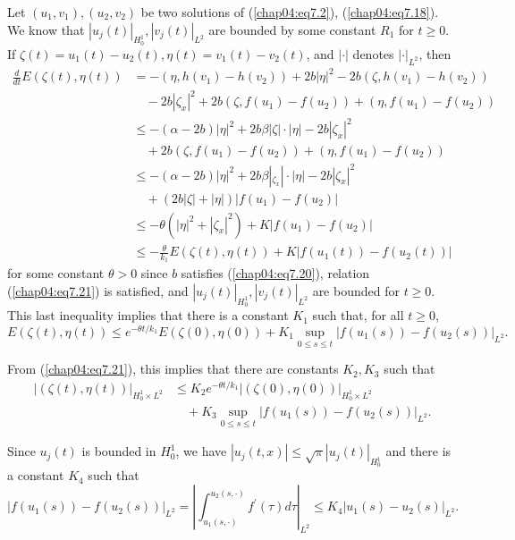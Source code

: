 \documentclass{surv-l}
\theoremstyle{plain}
\theoremstyle{definition}
\numberwithin{equation}{section}
\numberwithin{figure}{chapter}
\begin{document}
Let $(u_{1}, v_{1}), (u_{2}, v_{2})$ be two solutions of (\ref{chap04:eq7.2}), (\ref{chap04:eq7.18}). We know that $|u_{j}(t)|_{H_{0}^{1}}, |v_{j}(t)|_{L^{2}}$ are bounded by some constant $R_{1}$ for $t\geq 0$. If $\zeta(t)=u_{1}(t)-u_{2}(t), \eta(t)=v_{1}(t)-v_{2}(t)$, and $|\cdot|$ denotes $|\cdot|_{L^{2}}$, then
\begin{align*}
\frac{d}{dt}E(\zeta(t), \eta(t))&=-(\eta, h(v_{1})-h(v_{2}))+2b|\eta|^{2}-2b(\zeta, h(v_{1})-h(v_{2}))\\
&\quad-2b|\zeta_{x}|^{2}+2b(\zeta, f(u_{1})-f(u_{2}))+(\eta, f(u_{1})-f(u_{2}))\\
&\leq-(\alpha-2b)|\eta|^{2}+2b\beta|\zeta|\cdot|\eta|-2b|\zeta_{x}|^{2}\\
&\quad+2b(\zeta, f(u_{1})-f(u_{2}))+(\eta, f(u_{1})-f(u_{2}))\\
&\leq-(\alpha-2b)|\eta|^{2}+2b\beta|_{\zeta_{x}}|\cdot|\eta|-2b|\zeta_{x}|^{2}\\
&\quad+(2b|\zeta|+|\eta|)|f(u_{1})-f(u_{2})|\\
&\leq-\theta(|\eta|^{2}+|\zeta_{x}|^{2})+K|f(u_{1})-f(u_{2})|\\
&\leq-\frac{\theta}{k_{1}}E(\zeta(t), \eta(t))+K|f(u_{1}(t))-f(u_{2}(t))|
\end{align*}
for some constant $\theta>0$ since $b$ satisfies (\ref{chap04:eq7.20}), relation (\ref{chap04:eq7.21}) is satisfied, and $|u_{j}(t)|_{H_{0}^{1}}, |v_{j}(t)|_{L^{2}}$ are bounded for $t\geq 0$. This last inequality implies that there is a constant $K_{1}$ such that, for all $t\geq 0$,
\begin{equation}\label{chap04:eq7.22}
E(\zeta(t), \eta(t))\leq e^{-\theta t/k_{1}}E(\zeta(0), \eta(0))+K_{1}\sup_{0\leq s\leq t}|f(u_{1}(s))-f(u_{2}(s))|_{L^{2}}.
\end{equation}

From (\ref{chap04:eq7.21}), this implies that there are constants $K_{2}, K_{3}$ such that
\begin{equation}\label{chap04:eq7.23}
\begin{split}
|(\zeta(t), \eta(t))|_{H_{0}^{1}\times L^{2}}&\leq K_{2}e^{-\theta t/k_{1}}|(\zeta(0), \eta(0))|_{H_{0}^{1}\times L^{2}}\\
&\quad+K_{3}\sup_{0\leq s\leq t}|f(u_{1}(s))-f(u_{2}(s))|_{L^{2}}.
\end{split}
\end{equation}

Since $u_{j}(t)$ is bounded in $H_{0}^{1}$, we have $|u_{j}(t, x)|\leq\sqrt{\pi}|u_{j}(t)|_{H_{0}^{1}}$ and there is a constant $K_{4}$ such that
\begin{equation}\label{chap04:eq7.24}
|f(u_{1}(s))-f(u_{2}(s))|_{L^{2}}=\left|\int_{u_{1}(s,\cdot)}^{u_{2}(s,\cdot)}f^{\prime}(\tau)d\tau\right|_{L^{2}}\leq K_{4}|u_{1}(s)-u_{2}(s)|_{L^{2}}.
\end{equation}
\end{document}
